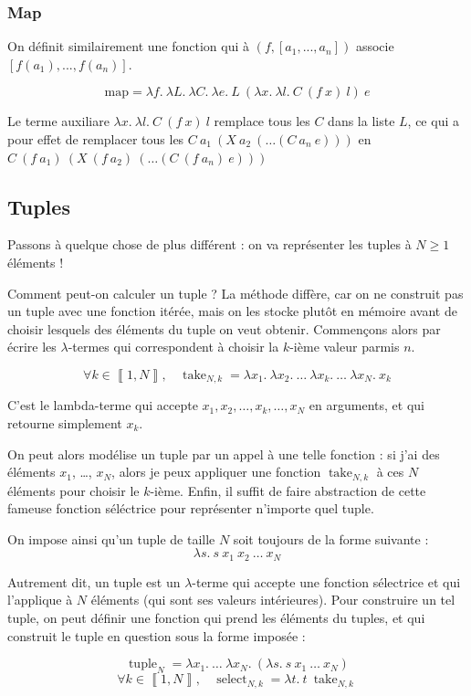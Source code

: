 \documentclass[11pt]{article}
\begin{document}
\subsubsection{Map}

On définit similairement une fonction qui à $(f, [a_1, ..., a_n])$ associe $[f(a_1), ..., f(a_n)]$.

$$\text{map} = \lambda f.~\lambda L.~\lambda C.~\lambda e.~L~(\lambda x.~\lambda l.~ C~(f~x)~l)~e$$

Le terme auxiliare $\lambda x.~\lambda l.~ C~(f~x)~l$ remplace tous les $C$ dans la liste $L$, ce qui a pour effet de remplacer tous les $C~a_1~(X~a_2~(\dots(C~a_n~e)))$ en $C~(f~a_1)~(X~(f~a_2)~(\dots(C~(f~a_n)~e)))$

\subsection{Tuples}

Passons à quelque chose de plus différent : on va représenter les tuples à $N \ge 1$ éléments !

Comment peut-on calculer un tuple ? La méthode diffère, car on ne construit pas un tuple avec une fonction itérée, mais on les stocke plutôt en mémoire avant de choisir lesquels des éléments du tuple on veut obtenir. Commençons alors par écrire les $\lambda$-termes qui correspondent à choisir la $k$-ième valeur parmis $n$.
\begin{definition}
    $$\forall k \in\left\llbracket1, N\right\rrbracket,~~~~\operatorname{take}_{N,k} = \lambda x_1.~\lambda x_2.~\dots~\lambda x_k.~\dots~\lambda x_N.~x_k$$

    C'est le lambda-terme qui accepte $x_1, x_2, \dots, x_k, \dots, x_N$ en arguments, et qui retourne simplement $x_k$.
\end{definition}

On peut alors modélise un tuple par un appel à une telle fonction : si j'ai des éléments $x_1$, \dots, $x_N$, alors je peux appliquer une fonction $\operatorname{take}_{N,k}$ à ces $N$ éléments pour choisir le $k$-ième. Enfin, il suffit de faire abstraction de cette fameuse fonction séléctrice pour représenter n'importe quel tuple.

On impose ainsi qu'un tuple de taille $N$ soit toujours de la forme suivante :
$$\lambda s.~s~x_1~x_2~\dots~x_N$$

Autrement dit, un tuple est un $\lambda$-terme qui accepte une fonction sélectrice et qui l'applique à $N$ éléments (qui sont ses valeurs intérieures). Pour construire un tel tuple, on peut définir une fonction qui prend les éléments du tuples, et qui construit le tuple en question sous la forme imposée :
\begin{definition}
    $$\operatorname{tuple}_{N}=\lambda x_1.~\dots~\lambda x_N.~\left(\lambda s.~s~x_1~\dots~x_N\right)$$
    $$\forall k \in\left\llbracket1, N\right\rrbracket,~~~~\operatorname{select}_{N, k} = \lambda t.~ t~\operatorname{take}_{N, k}$$
\end{definition}
\end{document}
